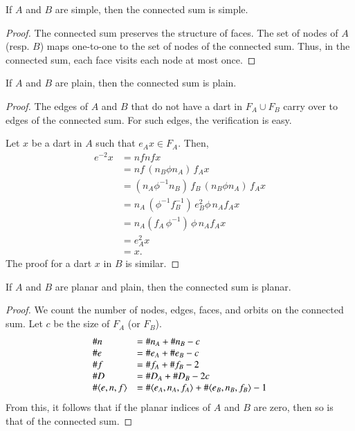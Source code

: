 \begin{lemma} If $A$ and $B$ are simple, then
the connected sum is simple.
\end{lemma}

\begin{proof} The connected sum preserves the structure of faces.
The set of nodes of $A$ (resp. $B$) maps one-to-one to the 
set of nodes of the
connected sum.  Thus, in the connected sum, each face visits each
node at most once.
\end{proof}

\begin{lemma} If $A$ and $B$ are plain, then
the connected sum is plain.
\end{lemma}

\begin{proof} The edges of $A$ and $B$ that do not have a dart
in $F_A\cup F_B$ carry over to edges of the connected sum.  For
such edges, the verification is easy.

Let $x$ be a dart in $A$ such that $e_A x \in F_A$.  Then,
     $$
     \begin{array}{lll}
     e^{-2} x &= n f n f x \\ &= n f\, (n_B \phi n_A)\, f_A x\\
               &= (n_A \phi^{-1} n_B)\, f_B\, (n_B \phi n_A)\, f_A x\\
               &= n_A\, (\phi^{-1} f_B^{-1})\, e_B^2 \phi\, n_A f_A x\\
               &= n_A (f_A\, \phi^{-1})\,\phi\, n_A f_A x\\
               &= e_A^2 x\\
               &= x.
     \end{array}
     $$
The proof for a dart $x$ in $B$ is similar.
\end{proof}

\begin{lemma} If $A$ and $B$ are planar and plain, then
    the connected sum is planar.
\end{lemma}

\begin{proof}  We count the number of nodes, edges, faces, and orbits
on the connected sum.  Let $c$ be the size of $F_A$ (or $F_B$).
$$
\begin{array}{lll}
  \#n &= \#n_A + \#n_B - c\\
  \#e &= \#e_A + \#e_B - c\\
  \#f &= \#f_A + \#f_B - 2\\
  \#D &= \#D_A + \#D_B - 2 c\\ 
  \#\langle e,n,f\rangle &= \#\langle e_A,n_A,f_A\rangle + \#\langle e_B,n_B,f_B\rangle - 1\\
\end{array}
$$
From this, it follows that if the planar indices of $A$ and $B$ are
zero, then so is that of the connected sum.
\end{proof}


